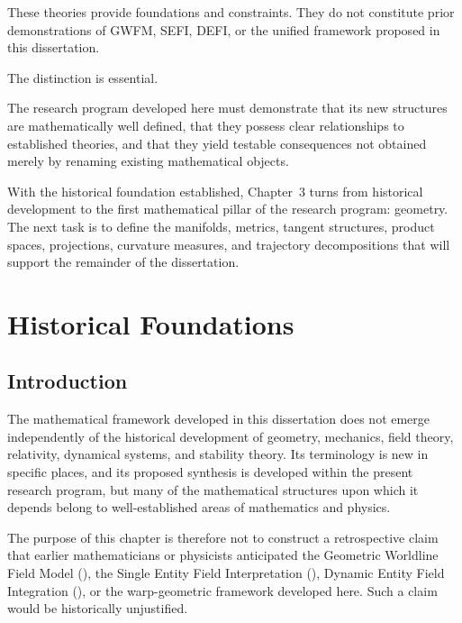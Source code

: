 \documentclass[12pt,oneside]{book}
\newcommand{\GWFM}{\mathrm{GWFM}}
\newcommand{\SEFI}{\mathrm{SEFI}}
\newcommand{\DEFI}{\mathrm{DEFI}}
\begin{document}
These theories provide foundations and constraints. They do not
constitute prior demonstrations of GWFM, SEFI, DEFI, or the
unified framework proposed in this dissertation.

The distinction is essential.

The research program developed here must demonstrate that its
new structures are mathematically well defined, that they
possess clear relationships to established theories, and that
they yield testable consequences not obtained merely by
renaming existing mathematical objects.

With the historical foundation established, Chapter~3 turns
from historical development to the first mathematical pillar of
the research program: geometry. The next task is to define the
manifolds, metrics, tangent structures, product spaces,
projections, curvature measures, and trajectory decompositions
that will support the remainder of the dissertation.

\chapter{Historical Foundations}
\label{chap:historical-foundations}


\section{Introduction}
\label{sec:historical-introduction}

The mathematical framework developed in this dissertation does
not emerge independently of the historical development of
geometry, mechanics, field theory, relativity, dynamical
systems, and stability theory. Its terminology is new in
specific places, and its proposed synthesis is developed within
the present research program, but many of the mathematical
structures upon which it depends belong to well-established
areas of mathematics and physics.

The purpose of this chapter is therefore not to construct a
retrospective claim that earlier mathematicians or physicists
anticipated the Geometric Worldline Field Model (\GWFM), the
Single Entity Field Interpretation (\SEFI), Dynamic Entity Field
Integration (\DEFI), or the warp-geometric framework developed
here. Such a claim would be historically unjustified.
\end{document}
